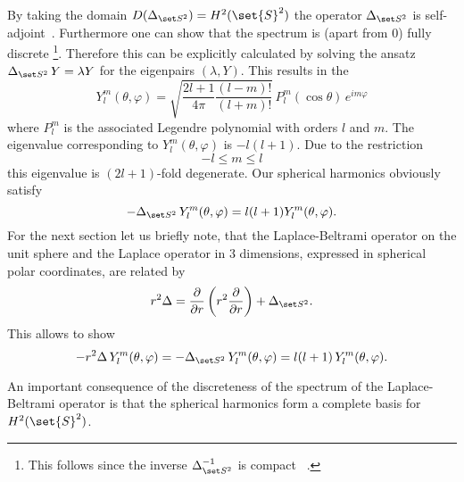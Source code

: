 By taking the domain $D(\laplaceSphere) = H^2(\set{S}^2)$
the operator $\laplaceSphere$ is self-adjoint~\cite[p.~120]{Helffer2013}.
Furthermore one can show that the spectrum is (apart from $0$) fully discrete%
\footnote{This follows since the inverse $\laplaceSphere^{-1}$ is compact%
~\cite[p.~44]{Helffer2013}.}.
Therefore this can be explicitly calculated by solving
the ansatz $\laplaceSphere \, Y = \lambda Y$
for the eigenpairs $(\lambda, Y)$.
This results in the 
\begin{equation}
	Y_l^m(\theta, \varphi) = \sqrt{\frac{2l + 1}{4 \pi} \frac{(l - m)!}{(l+m)!}}%
	\, P_l^m(\cos \theta) \, e^{im\varphi}
	\label{eqn:SphericaHarmonics}
\end{equation}
where $P_l^m$ is the associated Legendre polynomial with orders $l$ and $m$.
The eigenvalue corresponding to $Y_l^m(\theta, \varphi)$ is $-l (l+1)$.
Due to the restriction
\[ -l \le m \le l \]
this eigenvalue is $(2l+1)$-fold degenerate.
Our spherical harmonics obviously satisfy
\begin{equation}
	-\laplaceSphere \, Y_l^m(\theta, \varphi) = l (l+1) Y_l^m(\theta, \varphi).
	\label{eqn:Laplace}
\end{equation}
For the next section let us briefly note,
that the Laplace-Beltrami operator on the unit sphere
and the Laplace operator in $3$ dimensions,
expressed in spherical polar coordinates, are related by
\newcommand{\laplaceRadial}{\frac{\partial}{\partial r} \left( r^2 \frac{\partial}{\partial r} \right)}
\begin{equation}
r^2 \Delta = \laplaceRadial + \laplaceSphere.
	\label{eqn:LaplaceCorrespondance}
\end{equation}
This allows to show
\begin{equation}
	- r^2 \Delta \, Y_l^m(\theta, \varphi) =
	-\laplaceSphere \, Y_l^m(\theta, \varphi) = l (l+1) \, Y_l^m(\theta, \varphi).
	\label{eqn:LaplaceSphericalHarmonic}
\end{equation}

An important consequence of the discreteness of the spectrum
of the Laplace-Beltrami operator is that the spherical harmonics form
a complete basis for $H^2(\set{S}^2)$.

